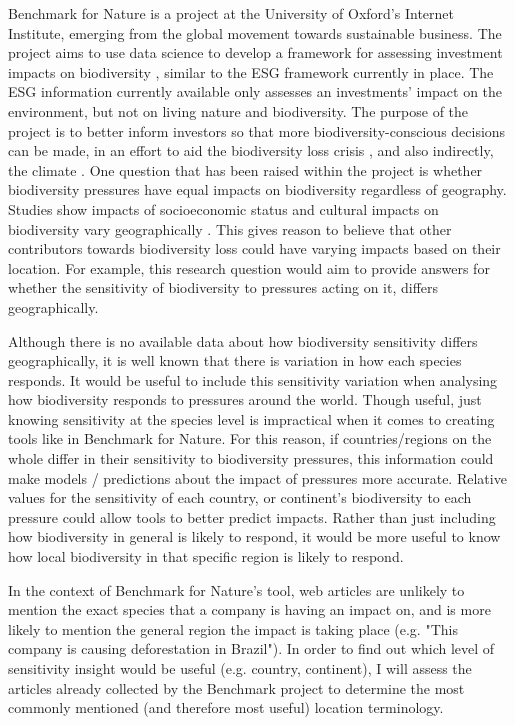 \documentclass[11pt, a4paper, titlepage]{article}
\begin{document}
   	 Benchmark for Nature is a project at the University of Oxford's Internet Institute, emerging from the global movement towards sustainable business. The project aims to use data science to develop a framework for assessing investment impacts on biodiversity \citep{iccs_2020}, similar to the ESG framework currently in place. The ESG information currently available only assesses an investments' impact on the environment, but not on living nature and biodiversity. The purpose of the project is to better inform investors so that more biodiversity-conscious decisions can be made, in an effort to aid the biodiversity loss crisis \citep{gasu2021review}, and also indirectly, the climate \citep{shin2022actions}.
   	 \newline
   	 \newline
   	  One question that has been raised within the project is whether biodiversity pressures have equal impacts on biodiversity regardless of geography. Studies show impacts of socioeconomic status and cultural impacts on biodiversity vary geographically \citep{kinzig2005effects}. This gives reason to believe that other contributors towards biodiversity loss could have varying impacts based on their location. For example, this research question would aim to provide answers for whether the sensitivity of biodiversity to pressures acting on it, differs geographically. \newline
   	 
   	 Although there is no available data about how biodiversity sensitivity differs geographically, it is well known that there is variation in how each species responds. It would be useful to include this sensitivity variation when analysing how biodiversity responds to pressures around the world. Though useful, just knowing sensitivity at the species level is impractical when it comes to creating tools like in Benchmark for Nature. For this reason, if countries/regions on the whole differ in their sensitivity to biodiversity pressures, this information could make models / predictions about the impact of pressures more accurate. Relative values for the sensitivity of each country, or continent's biodiversity to each pressure could allow tools to better predict impacts. Rather than just including how biodiversity in general is likely to respond, it would be more useful to know how local biodiversity in that specific region is likely to respond. \newline
   	 
   	 In the context of Benchmark for Nature's tool, web articles are unlikely to mention the exact species that a company is having an impact on, and is more likely to mention the general region the impact is taking place (e.g. "This company is causing deforestation in Brazil"). In order to find out which level of sensitivity insight would be useful (e.g. country, continent), I will assess the articles already collected by the Benchmark project to determine the most commonly mentioned (and therefore most useful) location terminology.  \newline
   	 
\end{document}
